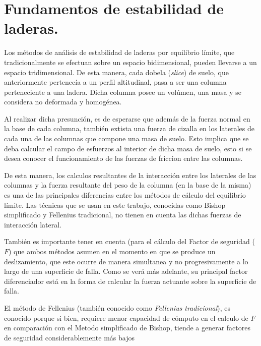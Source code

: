 \chapter{Fundamentos de estabilidad de laderas.}

Los m\'etodos de an\'alisis de estabilidad de laderas por equilibrio l\'imite, que tradicionalmente se efectuan sobre un espacio bidimensional, pueden llevarse a un espacio tridimensional.
De esta manera, cada dobela (\textit{slice}) de suelo, que anteriormente pertenec\'ia a un perfil altitudinal, pasa a ser una columna perteneciente a una ladera. Dicha columna posee un vol\'umen, una masa y se considera no deformada y homog\'enea.

Al realizar dicha presunci\'on, es de esperarse que adem\'as de la fuerza normal en la base de cada columna, tambi\'en extista una fuerza de cizalla en los laterales de cada una de las columnas que compone una masa de suelo. Esto implica que se deba calcular el campo de esfuerzos al interior de dicha masa de suelo, esto si se desea conocer el funcionamiento de las fuerzas de friccion entre las columnas.

De esta manera, los calculos resultantes de la interacci\'on entre los laterales de las columnas y la fuerza resultante del peso de la columna (en la base de la misma) es una de las principales diferencias entre los m\'etodos de c\'alculo del equilibrio l\'imite. Las t\'ecnicas que se usan en este trabajo, conocidas como Bishop simplificado y Fellenius tradicional, no tienen en cuenta las dichas fuerzas de interacci\'on lateral.

Tambi\'en es importante tener en cuenta (para el c\'alculo del Factor de seguridad (\(F\)) que ambos m\'etodos asumen en el momento en que se produce un deslizamiento, que este ocurre de manera simultanea y no progresivamente a lo largo de una superficie de falla. Como se ver\'a m\'as adelante, su principal factor diferenciador est\'a en la forma de calcular la fuerza actuante sobre la superficie de falla.

El m\'etodo de Fellenius (tambi\'en conocido como  \emph{Fellenius tradicional}), es conocido porque si bien, requiere menor capacidad de c\'omputo en el calculo de \(F\) en comparaci\'on con el Metodo simplificado de Bishop, tiende a generar factores de seguridad considerablemente m\'as bajos
